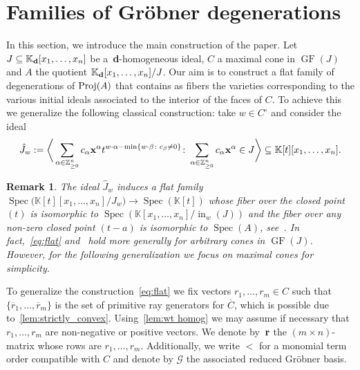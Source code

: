 \documentclass[10pt,a4paper]{amsart}
\newcommand{\thref}[1]{\ref{#1}}
\newtheorem{Remark}[Theorem]{Remark}}
\numberwithin{equation}{section}
\DeclareMathOperator{\init}{in}
\DeclareMathOperator{\GF}{GF}
\begin{document}
\section{Families of Gr\"obner degenerations}\label{sec:flat families}

In this section, we introduce the main construction of the paper.
Let $J \subseteq \mathbb K_{\bf d}[x_1, \dots , x_n]$ be a~{\bf d}-homogeneous ideal, $C $ a maximal cone in $\GF(J)$ and $A$ the quotient $\mathbb K_{\bf d}[x_1, \dots , x_n]/J$.
Our aim is to construct a flat family of degenerations of ${\rm Proj}(A)$ that contains as fibers the varieties corresponding to the various initial ideals associated to the interior of the faces of $C$.
To achieve this we generalize the following classical construction:
take $w\in C^\circ$ and consider the ideal
\begin{equation}\label{eq:flat}
\hat J_w:=\bigg\langle \sum_{\alpha \in \mathbb Z^n_{\ge 0}} c_\alpha {\bf x}^\alpha t^{w\cdot \alpha -\min\{w\cdot \beta \colon c_\beta \not =0\}} \colon \sum_{\alpha \in \mathbb Z^n_{\ge 0}} c_\alpha {\bf x}^\alpha\in J \bigg\rangle \subseteq \mathbb K[t][x_1,\dots,x_n].
\end{equation}

\begin{Remark}\label{rem:flat}
The ideal $\hat J_w$ induces a flat family $\operatorname{Spec} \big(\mathbb K[t][x_1,\dots,x_n]/\hat J_w\big) \to \operatorname{Spec}(\mathbb{K}[t])$
whose fiber over the closed point $(t)$ is isomorphic to $\operatorname{Spec}(\mathbb K[x_1,\dots,x_n]/\init_w(J))$ and the fiber over any non-zero closed point $ (t-a)$ is isomorphic to $\operatorname{Spec}(A)$, see~\cite[Theorem~15.17]{eisenbud2013commutative}.
In fact,~\eqref{eq:flat} and~\cite[Theorem~15.17]{eisenbud2013commutative} hold more generally for arbitrary cones in $\GF(J)$.
However, for the following generalization we focus on maximal cones for simplicity.
\end{Remark}

To generalize the construction~\eqref{eq:flat} we fix vectors $r_1, \dots , r_m \in C$ such that $\{ \overline{r}_1,\dots, \overline{r}_m \}$ is the set of primitive ray generators for $\overline{C}$, which is possible due to~\thref{lem:strictly_convex}.
Using~\thref{lem:wt homog} we may assume if necessary that $r_1,\dots, r_m $ are non-negative or positive vectors.
We denote by~${\bf r}$ the $(m\times n)$-matrix whose rows are $r_1,\dots, r_m$.
Additionally, we write $<$ for a monomial term order compatible with $C$ and denote by $\mathcal G$ the associated reduced Gr\"obner basis.
\end{document}
